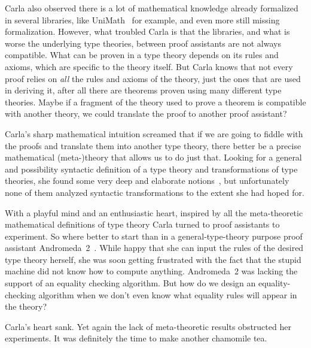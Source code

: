 Carla also observed there is a lot of mathematical knowledge already formalized in several libraries, like UniMath~ for example, and even more still missing formalization. However, what troubled Carla is that the libraries, and what is worse the underlying type theories, between proof assistants are not always compatible. What can be proven in a type theory depends on its rules and axioms, which are specific to the theory itself. But Carla knows that not every proof relies on \emph{all} the rules and axioms of the theory, just the ones that are used in deriving it, after all there are theorems proven using many different type theories. Maybe if a fragment of the theory used to prove a theorem is compatible with another theory, we could translate the proof to another proof assistant?

Carla's sharp mathematical intuition screamed that if we are going to fiddle with the proofs and translate them into another type theory, there better be a precise mathematical (meta-)theory that allows us to do just that. Looking for a general and possibility syntactic definition of a type theory and transformations of type theories, she found some very deep and elaborate notions~, but unfortunately none of them analyzed syntactic transformations to the extent she had hoped for.

With a playful mind and an enthusiastic heart, inspired by all the meta-theoretic mathematical definitions of type theory Carla turned to proof assistants to experiment. So where better to start than in a general-type-theory purpose proof assistant Andromeda~2~. While happy that she can input the rules of the desired type theory herself, she was soon getting frustrated with the fact that the stupid machine did not know how to compute anything. Andromeda~2 was lacking the support of an equality checking algorithm. But how do we design an equality-checking algorithm when we don't even know what equality rules will appear in the theory?

Carla's heart sank. Yet again the lack of meta-theoretic results obstructed her experiments. It was definitely the time to make another chamomile tea.

